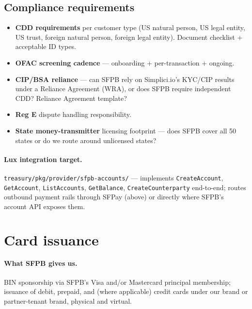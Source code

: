 \documentclass[11pt,letterpaper]{article}
\begin{document}
\subsection{Compliance requirements}
\begin{itemize}[leftmargin=1.6em]
  \item \textbf{CDD requirements} per customer type (US natural
        person, US legal entity, US trust, foreign natural person,
        foreign legal entity). Document checklist + acceptable ID
        types.
  \item \textbf{OFAC screening cadence} --- onboarding + per-transaction
        + ongoing.
  \item \textbf{CIP/BSA reliance} --- can SFPB rely on Simplici.io's
        KYC/CIP results under a Reliance Agreement (WRA), or does SFPB
        require independent CDD? Reliance Agreement template?
  \item \textbf{Reg E} dispute handling responsibility.
  \item \textbf{State money-transmitter} licensing footprint --- does
        SFPB cover all 50 states or do we route around unlicensed
        states?
\end{itemize}

\paragraph{Lux integration target.}
\texttt{treasury/pkg/provider/sfpb-accounts/} --- implements
\texttt{CreateAccount}, \texttt{GetAccount}, \texttt{ListAccounts},
\texttt{GetBalance}, \texttt{CreateCounterparty} end-to-end; routes
outbound payment rails through SFPay (above) or directly where SFPB's
account API exposes them.

\section{Card issuance}

\paragraph{What SFPB gives us.}
BIN sponsorship via SFPB's Visa and/or Mastercard principal membership;
issuance of debit, prepaid, and (where applicable) credit cards under
our brand or partner-tenant brand, physical and virtual.
\end{document}
